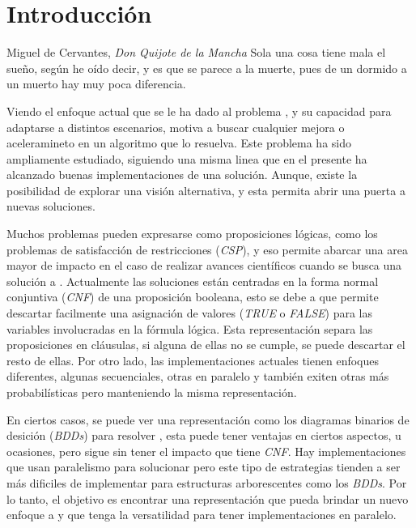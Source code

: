 \chapter{Introducción}

\begin{chapquote}{Miguel de Cervantes, \textit{Don Quijote de la Mancha}}
Sola una cosa tiene mala el sueño, según he oído decir, y es que se parece a la muerte, pues de un dormido a un muerto hay muy poca diferencia.
\end{chapquote}

Viendo el enfoque actual que se le ha dado al problema \sat, y su capacidad para adaptarse a distintos escenarios, motiva a buscar cualquier mejora o aceleramineto en un algoritmo que lo resuelva. Este problema ha sido ampliamente estudiado, siguiendo una misma linea que en el presente ha alcanzado buenas implementaciones de una solución. Aunque, existe la posibilidad de explorar una visión alternativa, y esta permita abrir una puerta a nuevas soluciones.

Muchos problemas pueden expresarse como proposiciones lógicas, como los problemas de satisfacción de restricciones (\textit{CSP}), y eso permite abarcar una area mayor de impacto en el caso de realizar avances científicos cuando se busca una solución a \sat. Actualmente las soluciones están centradas en la forma normal conjuntiva (\textit{CNF}) de una proposición booleana, esto se debe a que permite descartar facilmente una asignación de valores (\textit{TRUE} o \textit{FALSE}) para las variables involucradas en la fórmula lógica. Esta representación separa las proposiciones en cláusulas, si alguna de ellas no se cumple, se puede descartar el resto de ellas. Por otro lado, las implementaciones actuales tienen enfoques diferentes, algunas secuenciales, otras en paralelo y también exiten otras más probabilísticas pero manteniendo la misma representación.

En ciertos casos, se puede ver una representación como los diagramas binarios de desición (\textit{BDDs}) para resolver \sat, esta puede tener ventajas en ciertos aspectos, u ocasiones, pero sigue sin tener el impacto que tiene \textit{CNF}. Hay implementaciones que usan paralelismo para solucionar \sat pero este tipo de estrategias tienden a ser más dificiles de implementar para estructuras arborescentes como los \textit{BDDs}. Por lo tanto, el objetivo es encontrar una representación que pueda brindar un nuevo enfoque a \sat y que tenga la versatilidad para tener implementaciones en paralelo.

